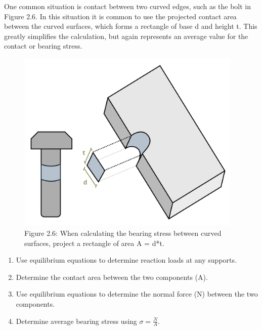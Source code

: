 \documentclass[
  letterpaper,
  DIV=11,
  numbers=noendperiod]{scrreprt}
\theoremstyle{definition}
\theoremstyle{remark}
\begin{document}
One common situation is contact between two curved edges, such as the
bolt in Figure 2.6. In this situation it is common to use the projected
contact area between the curved surfaces, which forms a rectangle of
base d and height t. This greatly simplifies the calculation, but again
represents an average value for the contact or bearing stress.

\begin{figure}[H]

{\centering \includegraphics[width=4.23958in,height=\textheight]{images/CH2 figures/2.6.png}

}

\caption{Figure 2.6: When calculating the bearing stress between curved
surfaces, project a rectangle of area A = d*t.}

\end{figure}%

\begin{tcolorbox}[enhanced jigsaw, leftrule=.75mm, colbacktitle=quarto-callout-warning-color!10!white, breakable, opacityback=0, colback=white, titlerule=0mm, toprule=.15mm, colframe=quarto-callout-warning-color-frame, coltitle=black, title={Step-by-step: Bearing Stress}, toptitle=1mm, bottomrule=.15mm, rightrule=.15mm, left=2mm, arc=.35mm, opacitybacktitle=0.6, bottomtitle=1mm]

\begin{enumerate}
\def\labelenumi{\arabic{enumi}.}
\item
  Use equilibrium equations to determine reaction loads at any supports.
\item
  Determine the contact area between the two components (A).
\item
  Use equilibrium equations to determine the normal force (N) between
  the two components.
\item
  Determine average bearing stress using \(\sigma=\frac{N}{A}\).
\end{enumerate}

\end{tcolorbox}
\end{document}
